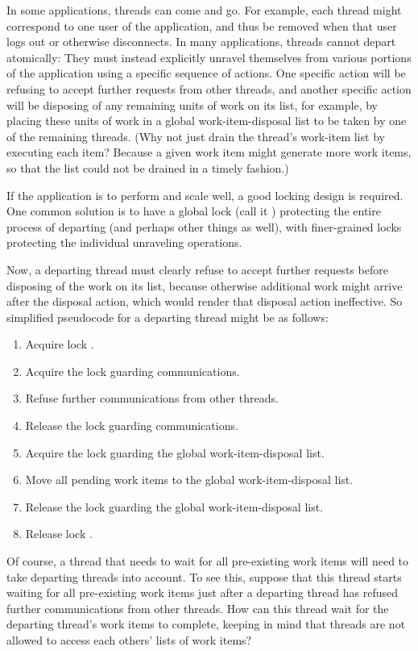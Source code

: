 	In some applications, threads can come and go.
	For example, each thread might correspond to one user of the
	application, and thus be removed when that user logs out or
	otherwise disconnects.
	In many applications, threads cannot depart atomically: They must
	instead explicitly unravel themselves from various portions of
	the application using a specific sequence of actions.
	One specific action will be refusing to accept further requests
	from other threads, and another specific action will be disposing
	of any remaining units of work on its list, for example, by
	placing these units of work in a global work-item-disposal list
	to be taken by one of the remaining threads.
	(Why not just drain the thread's work-item list by executing
	each item?
	Because a given work item might generate more work items, so
	that the list could not be drained in a timely fashion.)

	If the application is to perform and scale well, a good locking
	design is required.
	One common solution is to have a global lock (call it )
	protecting the entire
	process of departing (and perhaps other things as well),
	with finer-grained locks protecting the
	individual unraveling operations.

	Now, a departing thread must clearly refuse to accept further
	requests before disposing of the work on its list, because
	otherwise additional work might arrive after the disposal action,
	which would render that disposal action ineffective.
	So simplified pseudocode for a departing thread might be as follows:

	\begin{enumerate}
	\item	Acquire lock .
	\item	Acquire the lock guarding communications.
	\item	Refuse further communications from other threads.
	\item	Release the lock guarding communications.
	\item	Acquire the lock guarding the global work-item-disposal list.
	\item	Move all pending work items to the global
		work-item-disposal list.
	\item	Release the lock guarding the global work-item-disposal list.
	\item	Release lock .
	\end{enumerate}

	Of course, a thread that needs to wait for all pre-existing work
	items will need to take departing threads into account.
	To see this, suppose that this thread starts waiting for all
	pre-existing work items just after a departing thread has refused
	further communications from other threads.
	How can this thread wait for the departing thread's work items
	to complete, keeping in mind that threads are not allowed to
	access each others' lists of work items?

